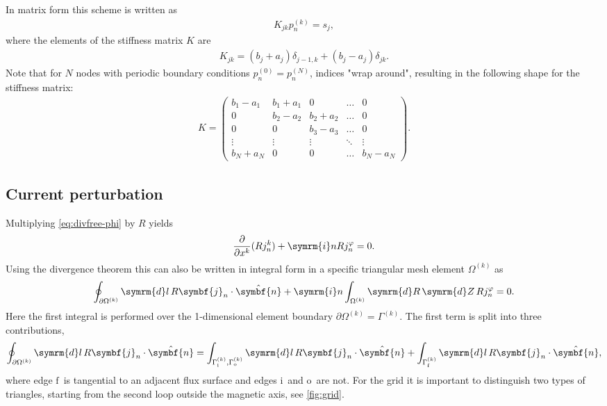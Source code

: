 \documentclass[a4paper, 10pt, english]{article}
\let\temp\varrho
\let\varrho\rho
\let\rho\temp
\let\temp\vartheta
\let\vartheta\theta
\let\theta\temp
\let\temp\varphi
\let\varphi\phi
\let\phi\temp
\let\vec\symbf
\newcommand*\diff{\ensuremath{\symrm{d}}}  %
\newcommand*\im{\ensuremath{\symrm{i}}}  %
\newcommand*\pd[2][]{\ensuremath{\frac{\partial #1}{\partial #2}}}  %
\newcommand*\fs{\ensuremath{\textrm{f}}}  %
\newcommand*\inw{\ensuremath{\textrm{i}}}  %
\newcommand*\out{\ensuremath{\textrm{o}}}  %
\begin{document}
In matrix form this scheme is written as
\begin{gather}
  K_{jk} p_{n}^{(k)} = s_{j},
\end{gather}
where the elements of the stiffness matrix $K$ are
\begin{gather}
  K_{jk} = (b_{j} + a_{j}) \delta_{j-1, k} + (b_{j} - a_{j}) \delta_{jk}.
\end{gather}
Note that for $N$ nodes with periodic boundary conditions $p_{n}^{(0)} = p_{n}^{(N)}$, indices "wrap around", resulting in the following shape for the stiffness matrix:
\begin{gather*}
  K = \begin{pmatrix}
    b_{1} - a_{1} &  b_{1} + a_{1} &        0       & \hdots &    0   \\
           0       & b_{2} - a_{2} &  b_{2} + a_{2} & \hdots &    0   \\
           0       &        0       & b_{3} - a_{3} & \hdots &    0   \\
        \vdots     &     \vdots     &     \vdots     & \ddots & \vdots \\
     b_{N} + a_{N} &        0       &        0       & \hdots & b_{N} - a_{N}
  \end{pmatrix}.
\end{gather*}

\subsection{Current perturbation}

Multiplying \cref{eq:divfree-phi} by $R$ yields
\begin{gather}
  \pd{x^{k}} (R j_{n}^{k}) + \im n R j_{n}^{\phi} = 0.
\end{gather}
Using the divergence theorem this can also be written in integral form in a specific triangular mesh element $\Omega^{(k)}$ as
\begin{gather}
  \oint_{\partial \Omega^{(k)}} \diff l \, R \vec{j}_{n} \cdot \hat{\vec{n}} + \im n \int_{\Omega^{(k)}} \diff R \, \diff Z \, R j_{n}^{\phi} = 0.
\end{gather}
Here the first integral is performed over the 1-dimensional element boundary $\partial \Omega^{(k)} = \Gamma^{(k)}$. The first term is split into three contributions,
\begin{gather}
  \oint_{\partial \Omega^{(k)}} \diff l \, R \vec{j}_{n} \cdot \hat{\vec{n}} = \int_{\Gamma_{\inw}^{(k)}, \Gamma_{\out}^{(k)}} \diff l \, R \vec{j}_{n} \cdot \hat{\vec{n}} + \int_{\Gamma_{\fs}^{(k)}} \diff l \, R \vec{j}_{n} \cdot \hat{\vec{n}},
\end{gather}
where edge \fs\ is tangential to an adjacent flux surface and edges \inw\ and \out\ are not. For the grid it is important to distinguish two types of triangles, starting from the second loop outside the magnetic axis, see \cref{fig:grid}.
\end{document}
